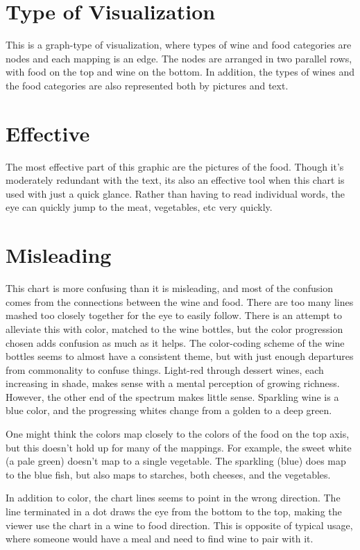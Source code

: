 \documentclass[a4paper,11pt]{article}
\begin{document}
\section{Type of Visualization}
This is a graph-type of visualization, where types of wine and food categories are nodes and each mapping is an edge.  The nodes are arranged in two parallel rows, with food on the top and wine on the bottom.  In addition, the types of wines and the food categories are also represented both by pictures and text.

\section{Effective}
The most effective part of this graphic are the pictures of the food.  Though it's moderately redundant with the text, its also an effective tool when this chart is used with just a quick glance.  Rather than having to read individual words, the eye can quickly jump to the meat, vegetables, etc very quickly.  

\section{Misleading}
This chart is more confusing than it is misleading, and most of the confusion comes from the connections between the wine and food.  There are too many lines mashed too closely together for the eye to easily follow.  There is an attempt to alleviate this with color, matched to the wine bottles, but the color progression chosen adds confusion as much as it helps.  The color-coding scheme of the wine bottles seems to almost have a consistent theme, but with just enough departures from commonality to confuse things.  Light-red through dessert wines, each increasing in shade, makes sense with a mental perception of growing richness.  However, the other end of the spectrum makes little sense.  Sparkling wine is a blue color, and the progressing whites change from a golden to a deep green.  

One might think the colors map closely to the colors of the food on the top axis, but this doesn't hold up for many of the mappings.  For example, the sweet white (a pale green) doesn't map to a single vegetable.  The sparkling (blue) does map to the blue fish, but also maps to starches, both cheeses, and the vegetables.

In addition to color, the chart lines seems to point in the wrong direction.  The line terminated in a dot draws the eye from the bottom to the top, making the viewer use the chart in a wine to food direction.  This is opposite of typical usage, where someone would have a meal and need to find wine to pair with it.  
\end{document}
